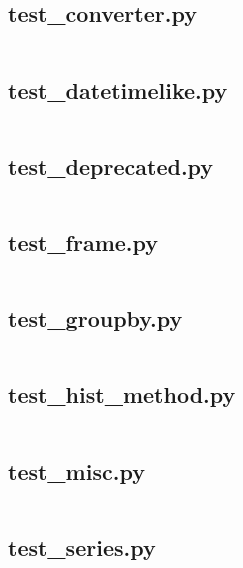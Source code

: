 \documentclass{article}
\begin{document}
\subsection{test\_converter.py}
\inputminted{python}{/home/dufferzafar/dev/@clones/pandas/pandas/tests/plotting/test_converter.py}
\newpage

\subsection{test\_datetimelike.py}
\inputminted{python}{/home/dufferzafar/dev/@clones/pandas/pandas/tests/plotting/test_datetimelike.py}
\newpage

\subsection{test\_deprecated.py}
\inputminted{python}{/home/dufferzafar/dev/@clones/pandas/pandas/tests/plotting/test_deprecated.py}
\newpage

\subsection{test\_frame.py}
\inputminted{python}{/home/dufferzafar/dev/@clones/pandas/pandas/tests/plotting/test_frame.py}
\newpage

\subsection{test\_groupby.py}
\inputminted{python}{/home/dufferzafar/dev/@clones/pandas/pandas/tests/plotting/test_groupby.py}
\newpage

\subsection{test\_hist\_method.py}
\inputminted{python}{/home/dufferzafar/dev/@clones/pandas/pandas/tests/plotting/test_hist_method.py}
\newpage

\subsection{test\_misc.py}
\inputminted{python}{/home/dufferzafar/dev/@clones/pandas/pandas/tests/plotting/test_misc.py}
\newpage

\subsection{test\_series.py}
\inputminted{python}{/home/dufferzafar/dev/@clones/pandas/pandas/tests/plotting/test_series.py}
\newpage
\end{document}
